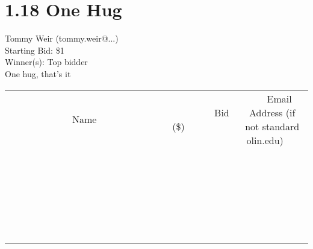 \documentclass[11pt]{article}
\begin{document}
\section*{1.18 One Hug}
Tommy Weir (tommy.weir@...) \\
Starting Bid: \$1 \\
Winner(s): 
Top bidder \\
One hug, that's it \\[6ex]
\begin{tabular}{c c c}
~~~~~~~~~~~~~Name~~~~~~~~~~~~~ & ~~~~~~~~~Bid (\$)~~~~~~~~~ & ~~~Email Address (if not standard olin.edu)~~~ \\
 & & \\
\hline
 & & \\
\hline
 & & \\
\hline
 & & \\
\hline
 & & \\
\hline
 & & \\
\hline
 & & \\
\hline
 & & \\
\hline
 & & \\
\hline
 & & \\
\hline
 & & \\
\hline
 & & \\
\hline
 & & \\
\hline
 & & \\
\hline
 & & \\
\hline
 & & \\
\hline
 & & \\
\hline
 & & \\
\hline
 & & \\
\hline
 & & \\
\hline
 & & \\
\hline
 & & \\
\hline
 & & \\
\hline
 & & \\
\hline
 & & \\
\hline
 & & \\
\hline
\end{tabular}
\clearpage
\end{document}
